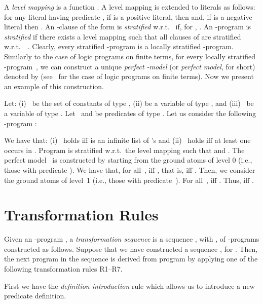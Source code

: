 \documentclass[english]{tlp}
\begin{document}
A \emph{level mapping} is a function . A level mapping is extended to
literals as follows: for any literal  having predicate , if
 is a positive literal, then  and, if  is a
negative literal then . An -clause
 of the form  is {\em stratified} w.r.t.~ if, for ,
. An -program  is
\emph{stratified} if there exists a level mapping  such that
all clauses of  are stratified w.r.t.~~\cite{Llo87}. 
Clearly, every stratified
-program is a locally stratified -program.
Similarly to the case of logic programs on finite terms, for every locally
stratified -program~, we can construct a unique {\em perfect
-model} (or {\em perfect model}, for short) denoted by
 (see~\cite{ApB94} for the case of logic programs on finite
terms). Now we present an example of this construction.


\begin{example}\label{ex:omega_prog}
Let: (i)~ be the set of constants of type
, (ii)  be a variable of type
, and (iii)~ be a variable of type
. Let ~and  be predicates of type
. Let us consider the
following -program :

\smallskip

\makebox[45mm][l]{}
\makebox[35mm][l]{}
\makebox[30mm][l]{}

\smallskip

\noindent We have that: (i)~ holds iff  is an infinite list of 's 
and (ii)~ holds iff at least one  occurs in .
Program  is  stratified w.r.t.~the level mapping  such that
 and {\mbox{}}. 
The perfect model~ is constructed by
starting from the ground atoms of level 0 (i.e., those with predicate
). We have that, for all~,
 iff  , that is, 
 iff  . Then, we
consider the ground atoms of level~1 (i.e., those with predicate~). 
For all~,  iff .
Thus,  iff . 
\end{example}



\section{Transformation Rules\label{sec:rules}}

Given an -program , a \emph{transformation sequence} is a sequence
, with , of \mbox{-programs} 
constructed as follows. Suppose that we have constructed a sequence
, for . Then, the next
program  in the sequence is derived from program 
by applying one of the following transformation rules \mbox{R1--R7}.

First we have the \emph{definition introduction} rule which allows
us to introduce a new predicate definition.
\end{document}
